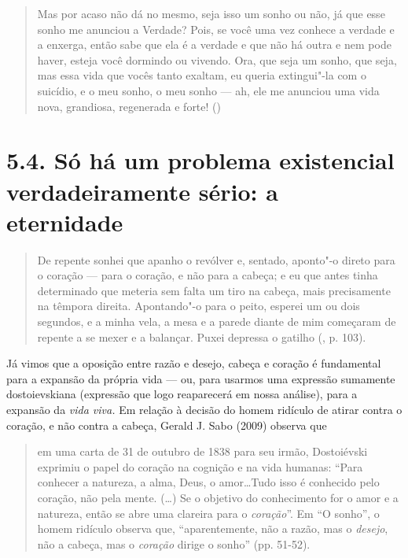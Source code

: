 \begin{quote}
Mas por acaso não dá no mesmo, seja isso um sonho ou não, já que esse
sonho me anunciou a Verdade? Pois, se você uma vez conhece a verdade e a
enxerga, então sabe que ela é a verdade e que não há outra e nem pode
haver, esteja você dormindo ou vivendo. Ora, que seja um sonho, que
seja, mas essa vida que vocês tanto exaltam, eu queria extingui"-la com o
suicídio, e o meu sonho, o meu sonho --- ah, ele me anunciou uma vida
nova, grandiosa, regenerada e forte! ()
\end{quote}

\section{5.4. Só há um problema existencial verdadeiramente sério: a
eternidade }

\begin{quote}
De repente sonhei que apanho o revólver e, sentado, aponto"-o direto para
o coração --- para o coração, e não para a cabeça; e eu que antes tinha
determinado que meteria sem falta um tiro na cabeça, mais precisamente
na têmpora direita. Apontando"-o para o peito, esperei um ou dois
segundos, e a minha vela, a mesa e a parede diante de mim começaram de
repente a se mexer e a balançar. Puxei depressa o gatilho (, p.
103).
\end{quote}

Já vimos que a oposição entre razão e desejo, cabeça e coração é
fundamental para a expansão da própria vida --- ou, para usarmos uma
expressão sumamente dostoievskiana (expressão que logo reaparecerá em
nossa análise), para a expansão da \emph{vida viva.} Em relação à
decisão do homem ridículo de atirar contra o coração, e não contra a
cabeça, Gerald J. Sabo (2009) observa que

\begin{quote}
em uma carta de 31 de outubro de 1838 para seu irmão, Dostoiévski
exprimiu o papel do coração na cognição e na vida humanas: ``Para
conhecer a natureza, a alma, Deus, o amor\ldots Tudo isso é conhecido pelo
coração, não pela mente. (\ldots) Se o objetivo do conhecimento for o amor
e a natureza, então se abre uma clareira para o \emph{coração}''. Em ``O
sonho'', o homem ridículo observa que, ``aparentemente, não a razão, mas
o \emph{desejo}, não a cabeça, mas o \emph{coração} dirige o sonho''
(pp. 51-52).
\end{quote}

